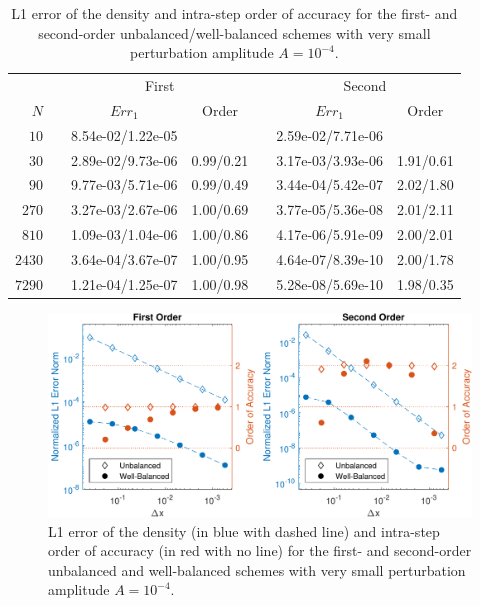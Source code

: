 \begin{table}\centering
\caption{L1 error of the density and intra-step order of accuracy for the first- and second-order unbalanced/well-balanced schemes with very small perturbation amplitude $A=10^{-4}$.}
\label{table:OVS_Asmall}
\begin{tabular}{@{}rcccccc@{}}\toprule
& \phantom{a} & \multicolumn{2}{c}{First} & \phantom{ab} & \multicolumn{2}{c}{Second}\\
\cmidrule{3-4} \cmidrule{6-7}
$N$ && $Err_1$ & Order && $Err_1$ & Order\\ \midrule
$10$ && 8.54e-02/1.22e-05 &&& 2.59e-02/7.71e-06 &\\
$30$ && 2.89e-02/9.73e-06 & 0.99/0.21 && 3.17e-03/3.93e-06 & 1.91/0.61\\
$90$ && 9.77e-03/5.71e-06 & 0.99/0.49 && 3.44e-04/5.42e-07 & 2.02/1.80\\
$270$ && 3.27e-03/2.67e-06 & 1.00/0.69 && 3.77e-05/5.36e-08 & 2.01/2.11\\
$810$ && 1.09e-03/1.04e-06 & 1.00/0.86 && 4.17e-06/5.91e-09 & 2.00/2.01\\
$2430$ && 3.64e-04/3.67e-07 & 1.00/0.95 && 4.64e-07/8.39e-10 & 2.00/1.78\\
$7290$ && 1.21e-04/1.25e-07 & 1.00/0.98 && 5.28e-08/5.69e-10 & 1.98/0.35\\
\bottomrule
\end{tabular}
\end{table}

\begin {figure}
\centering
\includegraphics[width=13cm]{figures/OVSeps0_0001}
\caption {L1 error of the density (in blue with dashed line) and intra-step order of accuracy (in red with no line) for the first- and second-order unbalanced and well-balanced schemes with very small perturbation amplitude $A=10^{-4}$.}
\label{fig:OVS_Asmall}
\end{figure}

